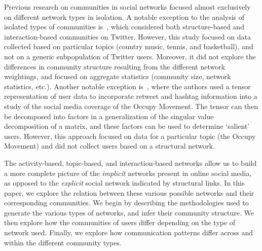 Previous research on communities in social networks focused almost exclusively on different network types in isolation.
A notable exception to the analysis of isolated types of communities is~\cite{lim2012tweets}, which considered both structure-based and interaction-based communities on Twitter. However, this study focused on data collected based on particular topics (country music, tennis, and basketball), and not on a generic subpopulation of Twitter users. Moreover, it did not explore the differences in community structure resulting from the different network weightings, and focused on aggregate statistics (community size, network statistics, etc.). Another notable exception is~\cite{kao2013talison}, where the authors used a tensor representation of user data to incorporate retweet and hashtag information into a study of the social media coverage of the Occupy Movement. The tensor can then be decomposed into factors in a generalization of the singular value decomposition of a matrix, and these factors can be used to determine `salient' users. However, this approach focused on data for a particular topic (the Occupy Movement) and did not collect users based on a structural network.

The activity-based, topic-based, and interaction-based networks allow us to build a more complete picture of the \emph{implicit} networks present in online social media, as opposed to the \emph{explicit} social network indicated by structural links. In this paper, we explore the relation between these various possible networks and their corresponding communities. We begin by describing the methodologies used to generate the various types of networks, and infer their community structure. We then explore how the communities of users differ depending on the type of network used. Finally, we explore how communication patterns differ across and within the different community types.





